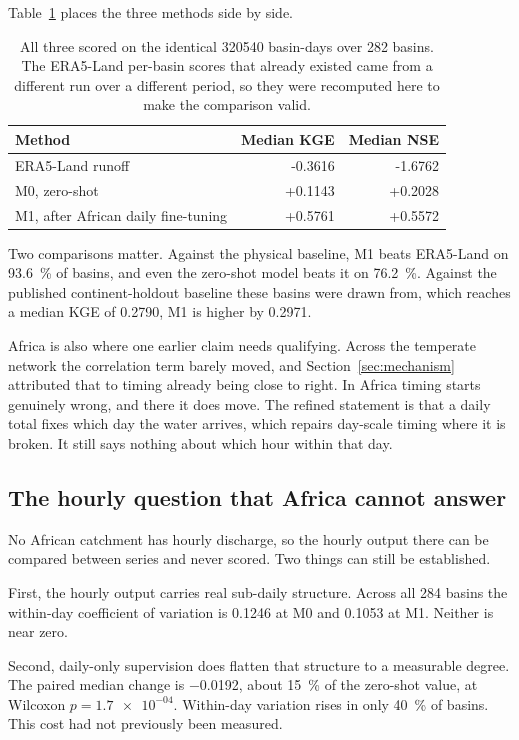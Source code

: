 \documentclass[11pt,a4paper]{article}
\begin{document}
Table~\ref{tab:threeway} places the three methods side by side.

\begin{table}[htbp]
  \centering
  \caption{All three scored on the identical \num{320540} basin-days over \num{282} basins. The ERA5-Land per-basin scores that already existed came from a different run over a different period, so they were recomputed here to make the comparison valid.}
  \label{tab:threeway}
  \begin{tabular}{lrr}
    \toprule
    Method & Median KGE & Median NSE \\
    \midrule
    ERA5-Land runoff & -0.3616 & -1.6762 \\
    M0, zero-shot & +0.1143 & +0.2028 \\
    M1, after African daily fine-tuning & +0.5761 & +0.5572 \\
    \bottomrule
  \end{tabular}
\end{table}

Two comparisons matter. Against the physical baseline, M1 beats ERA5-Land on \SI{93.6}{\percent} of basins, and even the zero-shot model beats it on \SI{76.2}{\percent}. Against the published continent-holdout baseline these basins were drawn from, which reaches a median KGE of \num{+0.2790}, M1 is higher by \num{+0.2971}.

Africa is also where one earlier claim needs qualifying. Across the temperate network the correlation term barely moved, and Section~\ref{sec:mechanism} attributed that to timing already being close to right. In Africa timing starts genuinely wrong, and there it does move. The refined statement is that a daily total fixes which day the water arrives, which repairs day-scale timing where it is broken. It still says nothing about which hour within that day.

\subsection{The hourly question that Africa cannot answer}
No African catchment has hourly discharge, so the hourly output there can be compared between series and never scored. Two things can still be established.

First, the hourly output carries real sub-daily structure. Across all \num{284} basins the within-day coefficient of variation is \num{0.1246} at M0 and \num{0.1053} at M1. Neither is near zero.

Second, daily-only supervision does flatten that structure to a measurable degree. The paired median change is \num{-0.0192}, about \SI{15}{\percent} of the zero-shot value, at Wilcoxon $p = \num{1.7e-04}$. Within-day variation rises in only \SI{40}{\percent} of basins. This cost had not previously been measured.
\end{document}
